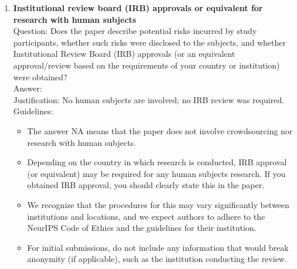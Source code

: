 \documentclass{article}
\begin{document}
\begin{enumerate}
\item {\bf Institutional review board (IRB) approvals or equivalent for research with human subjects}\\
Question: Does the paper describe potential risks incurred by study participants, whether such risks were disclosed to the subjects, and whether Institutional Review Board (IRB) approvals (or an equivalent approval/review based on the requirements of your country or institution) were obtained?\\
Answer: \answerNA{}\\
Justification: No human subjects are involved; no IRB review was required.\\
Guidelines:
\begin{itemize}
\item The answer NA means that the paper does not involve crowdsourcing nor research with human subjects.
\item Depending on the country in which research is conducted, IRB approval (or equivalent) may be required for any human subjects research. If you obtained IRB approval, you should clearly state this in the paper.
\item We recognize that the procedures for this may vary significantly between institutions and locations, and we expect authors to adhere to the NeurIPS Code of Ethics and the guidelines for their institution.
\item For initial submissions, do not include any information that would break anonymity (if applicable), such as the institution conducting the review.
\end{itemize}


\end{enumerate}
\end{document}
